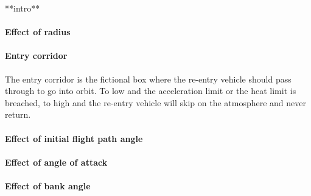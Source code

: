 **intro**

\paragraph{Effect of radius}

\paragraph{Entry corridor}
The entry corridor is the fictional box where the re-entry vehicle should pass through to go into orbit. To low and the acceleration limit or the heat limit is breached, to high and the re-entry vehicle will skip on the atmosphere and never return. 

\paragraph{Effect of initial flight path angle}

\paragraph{Effect of angle of attack}

\paragraph{Effect of bank angle}



